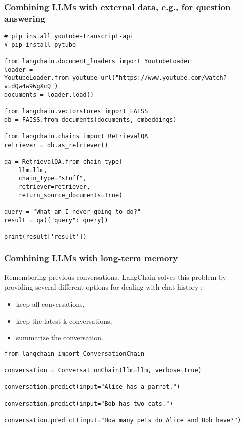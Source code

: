 \begin{frame}[fragile]\frametitle{Combining LLMs with external data, e.g., for question answering}


\begin{lstlisting}
# pip install youtube-transcript-api
# pip install pytube

from langchain.document_loaders import YoutubeLoader
loader = YoutubeLoader.from_youtube_url("https://www.youtube.com/watch?v=dQw4w9WgXcQ")
documents = loader.load()

from langchain.vectorstores import FAISS
db = FAISS.from_documents(documents, embeddings)

from langchain.chains import RetrievalQA
retriever = db.as_retriever()

qa = RetrievalQA.from_chain_type(
    llm=llm, 
    chain_type="stuff", 
    retriever=retriever, 
    return_source_documents=True)

query = "What am I never going to do?"
result = qa({"query": query})

print(result['result'])
\end{lstlisting}


\end{frame}


\begin{frame}[fragile]\frametitle{Combining LLMs with long-term memory}

Remembering previous conversations. LangChain solves this problem by providing several different options for dealing with chat history :

\begin{itemize}
\item keep all conversations,
\item keep the latest k conversations,
\item summarize the conversation.
\end{itemize}

\begin{lstlisting}
from langchain import ConversationChain

conversation = ConversationChain(llm=llm, verbose=True)

conversation.predict(input="Alice has a parrot.")

conversation.predict(input="Bob has two cats.")

conversation.predict(input="How many pets do Alice and Bob have?")
\end{lstlisting}


\end{frame}


